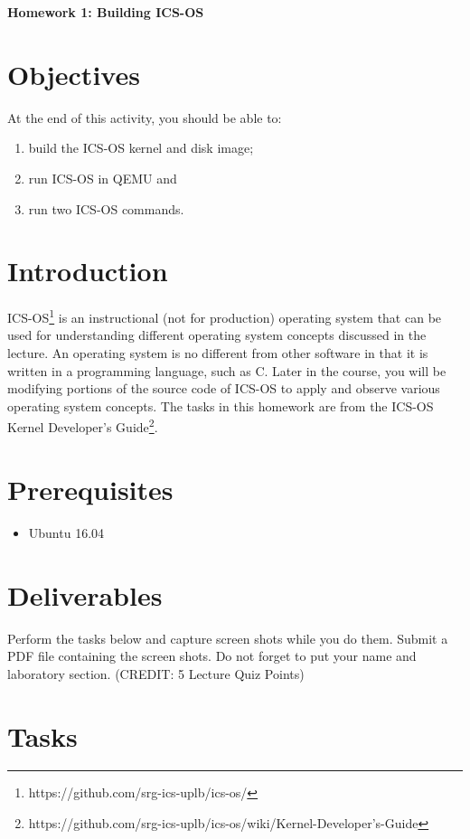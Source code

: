 \documentclass[a4paper, 11pt,oneside]{article}
\begin{document}
\begin{center}
	{\LARGE \textbf{Homework 1: Building ICS-OS}}
\end{center}

\section*{Objectives}
   At the end of this activity, you should be able to:
   \begin{enumerate}
       \item build the ICS-OS kernel and disk image;
       \item run ICS-OS in QEMU and
       \item run two ICS-OS commands.
   \end{enumerate}   

\section{Introduction}
ICS-OS\footnote{https://github.com/srg-ics-uplb/ics-os/} is an instructional (not for production) operating system that can be used for understanding different operating system concepts discussed 
in the lecture. 
An operating system is no different from other software in that it is written in a programming language,  
such as C. Later in the course, you will be modifying portions of the source code of ICS-OS to 
apply and observe various operating system concepts. The tasks  in this homework are from the ICS-OS Kernel Developer's Guide\footnote{https://github.com/srg-ics-uplb/ics-os/wiki/Kernel-Developer's-Guide}.

\section{Prerequisites}
\begin{itemize}
  \item Ubuntu 16.04
\end{itemize}   


\section{Deliverables}
Perform the tasks below and capture screen shots while you do them. Submit a PDF file 
containing the screen shots. Do not forget to put your name and laboratory section. (CREDIT: 5 Lecture Quiz Points)


\section{Tasks}
\end{document}
